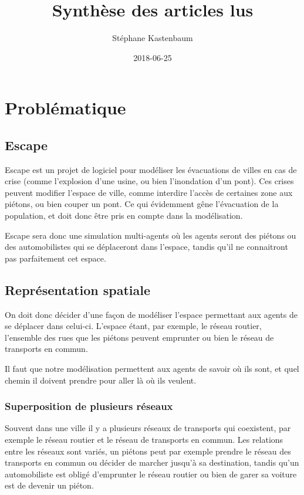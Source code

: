 \documentclass[a4paper]{article}
\title{Synthèse des articles lus}
\author{Stéphane Kastenbaum}
\date{2018-06-25}
\begin{document}
\maketitle

\section{Problématique}

\subsection{Escape}

Escape est un projet de logiciel pour modéliser les évacuations de villes en cas
de crise (comme l'explosion d'une usine, ou bien l'inondation d'un pont).  Ces
crises peuvent modifier l'espace de ville, comme interdire l'accès de certaines
zone aux piétons, ou bien couper un pont. Ce qui évidemment gêne l'évacuation de
la population, et doit donc être pris en compte dans la modélisation.

Escape sera donc une simulation multi-agents où les agents seront des piétons ou
des automobilistes qui se déplaceront dans l'espace, tandis qu'il ne connaitront
pas parfaitement cet espace.

\subsection{Représentation spatiale}

On doit donc décider d'une façon de modéliser l'espace permettant aux agents de
se déplacer dans celui-ci. L'espace étant, par exemple, le réseau routier,
l'ensemble des rues que les piétons peuvent emprunter ou bien le réseau de
transports en commun.

Il faut que notre modélisation permettent aux agents de savoir où ils sont, et
quel chemin il doivent prendre pour aller là où ils veulent.

  \subsubsection{Superposition de plusieurs réseaux}

  Souvent dans une ville il y a plusieurs réseaux de transports qui coexistent,
  par exemple le réseau routier et le réseau de transports en commun. Les
  relations entre les réseaux sont variés, un piétons peut par exemple prendre
  le réseau des transports en commun ou décider de marcher jusqu'à sa
  destination, tandis qu'un automobiliste est obligé d'emprunter le réseau
  routier ou bien de garer sa voiture est de devenir un piéton.
\end{document}
